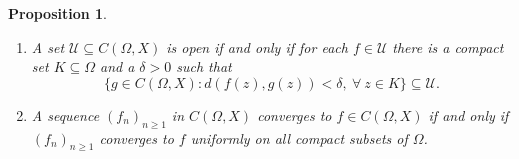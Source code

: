 \documentclass[11pt]{article}
\theoremstyle{thmstyle}
\newtheorem{proposition}[theorem]{Proposition}
\theoremstyle{defstyle}
\newcommand{\calU}{\mathcal{U}}
\renewcommand{\ge}{\geqslant}
\begin{document}
\begin{proposition}
\begin{enumerate}[label=(\arabic*)]
    \item A set $\calU\subseteq C(\Omega, X)$ is open if and only if for each $f\in\calU$ there is a compact set $K\subseteq\Omega$ and a $\delta > 0$ such that 
    \begin{equation*}
        \{g\in C(\Omega, X)\colon d(f(z), g(z)) < \delta,~\forall~z\in K\}\subseteq\calU.
    \end{equation*}
    \item A sequence $(f_n)_{n\ge 1}$ in $C(\Omega, X)$ converges to $f\in C(\Omega, X)$ if and only if $(f_n)_{n\ge 1}$ converges to $f$ uniformly on all compact subsets of $\Omega$.
\end{enumerate}
\end{proposition}
\end{document}
